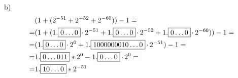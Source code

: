 \begin{task}{b)}
\begin{align*}
&(1+(2^{-51}+2^{-52}+2^{-60}))-1= \\ =
&(1+(1.\boxed{0\ldots0}\operatorname{\cdot}2^{-51}+1.\boxed{0\ldots0}\operatorname{\cdot}2^{-52}+1.\boxed{0\ldots0}\operatorname{\cdot}2^{-60}))-1= \\ =
&(1.\boxed{0\ldots0}\operatorname{\cdot}2^0+1.\boxed{1000000010\ldots0}\operatorname{\cdot}2^{-51})-1= \\ =
&1.\boxed{0\ldots011}*2^0-1.\boxed{0\ldots0}\operatorname{\cdot}2^0= \\ =
&1.\boxed{10\ldots0}*2^{-51}
\end{align*}
\end{task}